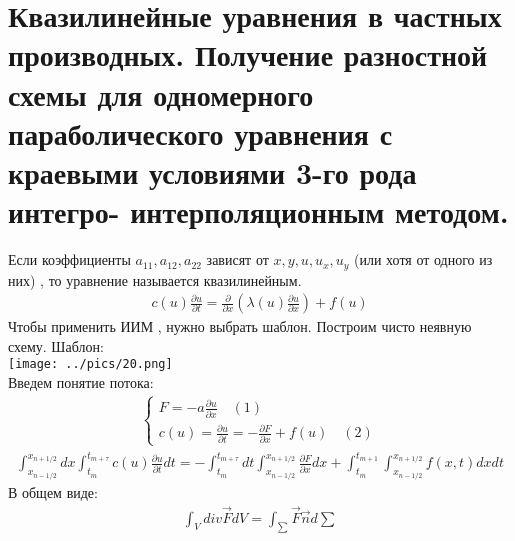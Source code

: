 \documentclass[12pt,a4paper]{article}
\begin{document}
	\section{Квазилинейные уравнения в частных производных. Получение разностной схемы для одномерного параболического уравнения с краевыми условиями 3-го рода интегро- интерполяционным методом.}
	Если коэффициенты $a_{11}, a_{12}, a_{22}$ зависят от $x,y,u,u_x,u_y$ (или хотя от одного из них) , то уравнение называется квазилинейным.\\
	\begin{align*}
	c(u) \frac{\partial u}{\partial t} = \frac{\partial}{\partial x}\left( \lambda(u)\frac{\partial u}{\partial x} \right) + f(u)
	\end{align*}
	Чтобы применить ИИМ , нужно выбрать шаблон. Построим чисто неявную схему. Шаблон:\\
	\texttt{[image: ../pics/20.png]}\\
	Введем понятие потока:\\
	\begin{align*}
	\begin{cases}
	F = -a \frac{\partial u}{\partial x} \quad (1)\\
	c(u) = \frac{\partial u}{\partial t} = -\frac{\partial F}{\partial x} + f(u) \quad (2)
	\end{cases}
	\end{align*}
	\begin{align*}
	\int_{x_{n-1/2}}^{x_{n+1/2}}dx\int_{t_m}^{t_{m+\tau}} c(u) \frac{\partial u}{\partial t}dt =  -\int_{t_m}^{t_{m+\tau}} dt \int_{x_{n-1/2}}^{x_{n+1/2}}\frac{\partial F}{\partial x}dx + \int_{t_m}^{t_{m+1}}\int_{x_{n-1/2}}^{x_{n+1/2}}f(x,t) dx dt
	\end{align*}	
	В общем виде:
	\begin{align*}
	\int_{V}div \vec{F} dV = \int_{\sum} \vec{F} \vec{n} d\sum
	\end{align*}
\end{document}

